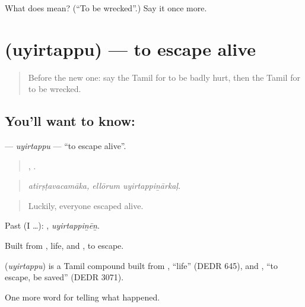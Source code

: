 \begin{tcolorbox}[breakable,colback=teal!4,colframe=teal!35!black,title={Before you move on}]
What does  mean? (\textquotedblleft{}To be wrecked\textquotedblright{}.) Say it once more.
\end{tcolorbox}
\section[\texorpdfstring{\ta{உயிர்தப்பு} (uyirtappu)}{உயிர்தப்பு (uyirtappu)}]{ (uyirtappu) — to escape alive}

\label{lesson:TA-C298-uyirtappu}



\begin{quote}
Before the new one: say the Tamil for to be badly hurt, then the Tamil for to be wrecked.
\end{quote}

\subsection*{You'll want to know: }
\textbf{} — \emph{uyirtappu} — \textquotedblleft{}to escape alive\textquotedblright{}.

\begin{quote}
,  .
\end{quote}

\begin{quote}
\emph{atirṣṭavacamāka, ellōrum uyirtappiṉārkaḷ.}
\end{quote}

\begin{quote}
Luckily, everyone escaped alive.
\end{quote}

Past (I …): , \emph{uyirtappiṉēṉ}.

Built from , life, and , to escape.

\begin{cousinweb}
\textbf{} (\emph{uyirtappu}) is a Tamil compound built from , \textquotedblleft{}life\textquotedblright{} (DEDR 645), and , \textquotedblleft{}to escape, be saved\textquotedblright{} (DEDR 3071).
\end{cousinweb}

\begin{grammarlens}[title={What you've built}]
One more word for telling what happened.
\end{grammarlens}

